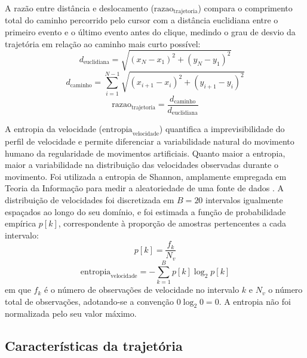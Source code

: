A razão entre distância e deslocamento ($\text{razao}_{\text{trajetoria}}$) compara o comprimento total do caminho percorrido pelo cursor com a distância euclidiana entre o primeiro evento e o último evento antes do clique, medindo o grau de desvio da trajetória em relação ao caminho mais curto possível:
\begin{equation}
    d_{\text{euclidiana}} = \sqrt{(x_{N} - x_1)^2 + (y_{N} - y_1)^2}
    \label{eq:d_euclidiana}
\end{equation}
\begin{equation}
    d_{\text{caminho}} = \sum_{i=1}^{N-1} \sqrt{(x_{i+1} - x_i)^2 + (y_{i+1} - y_i)^2}
    \label{eq:d_caminho}
\end{equation}
\begin{equation}
    \text{razao}_{\text{trajetoria}} = \frac{d_{\text{caminho}}}{d_{\text{euclidiana}}}
    \label{eq:razao_trajetoria}
\end{equation}

A entropia da velocidade ($\text{entropia}_{\text{velocidade}}$) quantifica a imprevisibilidade do perfil de velocidade e permite diferenciar a variabilidade natural do movimento humano da regularidade de movimentos artificiais. Quanto maior a entropia, maior a variabilidade na distribuição das velocidades observadas durante o movimento. Foi utilizada a entropia de Shannon, amplamente empregada em Teoria da Informação para medir a aleatoriedade de uma fonte de dados \cite{magossi2021}. A distribuição de velocidades foi discretizada em $B = 20$ intervalos igualmente espaçados ao longo do seu domínio, e foi estimada a função de probabilidade empírica $p[k]$, correspondente à proporção de amostras pertencentes a cada intervalo:
\begin{equation}
    p[k] = \frac{f_k}{N_v}
    \label{eq:prob_velocidade}
\end{equation}
\begin{equation}
    \text{entropia}_{\text{velocidade}} = -\sum_{k=1}^{B} p[k] \log_2 p[k]
    \label{eq:entropia_velocidade}
\end{equation}
em que $f_k$ é o número de observações de velocidade no intervalo $k$ e $N_v$ o número total de observações, adotando-se a convenção $0 \log_2 0 = 0$. A entropia não foi normalizada pelo seu valor máximo.

\subsection{Características da trajetória}

